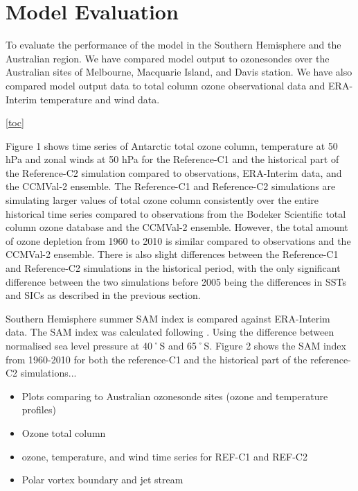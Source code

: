 \section{Model Evaluation}
To evaluate the performance of the model in the Southern Hemisphere and the Australian region. We have compared model output to ozonesondes over the Australian sites of Melbourne, Macquarie Island, and Davis station. We have also compared model output data to total column ozone observational data and ERA-Interim temperature and wind data. 

\ref{toc}

Figure 1 shows time series of Antarctic total ozone column, temperature at 50 hPa and zonal winds at 50 hPa for the Reference-C1 and the historical part of the Reference-C2 simulation compared to observations, ERA-Interim data, and the CCMVal-2 ensemble. The Reference-C1 and Reference-C2 simulations are simulating larger values of total ozone column consistently over the entire historical time series compared to observations from the Bodeker Scientific total column ozone database and the CCMVal-2 ensemble. However, the total amount of ozone depletion from 1960 to 2010 is similar compared to observations and the CCMVal-2 ensemble. There is also slight differences between the Reference-C1 and Reference-C2 simulations in the historical period, with the only significant difference between the two simulations before 2005 being the differences in SSTs and SICs as described in the previous section.

Southern Hemisphere summer SAM index is compared against ERA-Interim data. The SAM index was calculated following \cite{DaoyiGong:2007vm}. Using the difference between normalised sea level pressure at 40˚S and 65˚S. Figure 2 shows the SAM index from 1960-2010 for both the reference-C1 and the historical part of the reference-C2 simulations...

\begin{itemize}
\item Plots comparing to Australian ozonesonde sites (ozone and temperature profiles)
\item Ozone total column
\item ozone, temperature, and wind time series for REF-C1 and REF-C2
\item Polar vortex boundary and jet stream
\end{itemize}